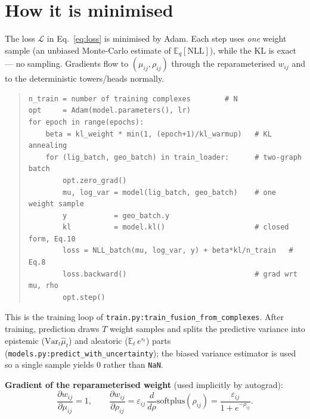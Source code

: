 \documentclass[11pt,a4paper]{article}
\newcommand{\code}[1]{\texttt{#1}}
\newcommand{\softplus}{\mathrm{softplus}}
\newcommand{\NLL}{\mathrm{NLL}}
\begin{document}
\section{How it is minimised}
\label{sec:minimise}

The loss $\mathcal{L}$ in Eq.~\eqref{eq:loss} is minimised by Adam. Each step uses
\emph{one} weight sample (an unbiased Monte-Carlo estimate of $\mathbb{E}_q[\NLL]$),
while the KL is exact --- no sampling. Gradients flow to $(\mu_{ij}, \rho_{ij})$
through the reparameterised $w_{ij}$ and to the deterministic towers/heads normally.

\begin{quote}
\begin{verbatim}
n_train = number of training complexes        # N
opt     = Adam(model.parameters(), lr)
for epoch in range(epochs):
    beta = kl_weight * min(1, (epoch+1)/kl_warmup)   # KL annealing
    for (lig_batch, geo_batch) in train_loader:      # two-graph batch
        opt.zero_grad()
        mu, log_var = model(lig_batch, geo_batch)    # one weight sample
        y           = geo_batch.y
        kl          = model.kl()                     # closed form, Eq.10
        loss = NLL_batch(mu, log_var, y) + beta*kl/n_train   # Eq.8
        loss.backward()                              # grad wrt mu, rho
        opt.step()
\end{verbatim}
\end{quote}

\noindent This is the training loop of
\code{train.py:train\_fusion\_from\_complexes}. After training, prediction draws
$T$ weight samples and splits the
predictive variance into epistemic ($\mathrm{Var}_t\hat\mu_t$) and aleatoric
($\mathbb{E}_t\,e^{s_t}$) parts (\code{models.py:predict\_with\_uncertainty}); the
biased variance estimator is used so a single sample yields $0$ rather than
\code{NaN}.

\medskip
\noindent\textbf{Gradient of the reparameterised weight} (used implicitly by autograd):
\begin{equation}
\frac{\partial w_{ij}}{\partial \mu_{ij}} = 1,
\qquad
\frac{\partial w_{ij}}{\partial \rho_{ij}}
= \varepsilon_{ij}\,\frac{d}{d\rho}\softplus(\rho_{ij})
= \frac{\varepsilon_{ij}}{1 + e^{-\rho_{ij}}} .
\end{equation}

\end{document}
